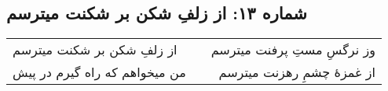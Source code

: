 \begin{center}
\section*{شماره ۱۳: از زلفِ شکن بر شکنت میترسم}
\label{sec:013}
\begin{longtable}{l p{0.5cm} r}
از زلفِ شکن بر شکنت میترسم
&&
وز نرگسِ مستِ پرفنت میترسم
\\
من میخواهم که راه گیرم در پیش
&&
از غمزهٔ چشمِ رهزنت میترسم
\\
\end{longtable}
\end{center}
